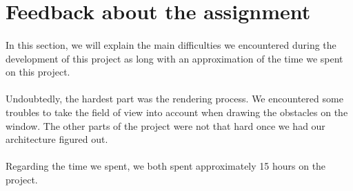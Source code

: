 \documentclass[a4paper, 11pt, oneside]{article}
\begin{document}
\section{Feedback about the assignment}
\paragraph{}In this section, we will explain the main difficulties we encountered during the development of this project as long with an approximation of the time we spent on this project.
\paragraph{}Undoubtedly, the hardest part was the rendering process. We encountered some troubles to take the field of view into account when drawing the obstacles on the window. The other parts of the project were not that hard once we had our architecture figured out.
\paragraph{}Regarding the time we spent, we both spent approximately 15 hours on the project.

\end{document}
